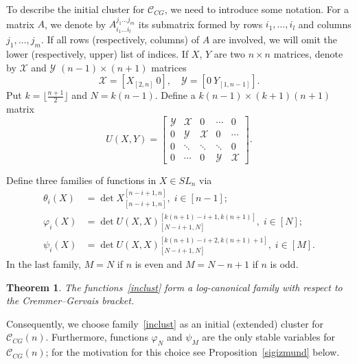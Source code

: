 \documentclass{amsart}
\newtheorem{theorem}{Theorem}
\theoremstyle{definition}
\theoremstyle{remark}
\numberwithin{equation}{section}
\numberwithin{theorem}{section}
\begin{document}
To describe the initial cluster for  ${{\mathcal C}}_{CG}$, we need to introduce some notation.
For a matrix $A$, we denote by $A_{i_1\ldots i_l}^{j_1\ldots j_m}$ its submatrix formed
by rows $i_1,\ldots, i_l$ and columns $j_1,\ldots, j_m$. If all rows (respectively, columns) of $A$ are 
involved, we will omit the lower (respectively, upper) list of indices.
If $X$, $Y$ are two $n\times n$ matrices, denote by  ${{\mathcal X}}$ and ${{\mathcal Y}}$  $(n-1)\times (n+1)$ matrices 
$$
{{\mathcal X}} = \left [ X_{[2,n]}\  0\right ], \quad {{\mathcal Y}} = \left [0\   Y_{[1,n-1]} \right ].
$$
Put $k=\lfloor \frac{n+1}{2}\rfloor$ and $N=k (n-1)$. Define a $k (n-1) \times (k+1) (n+1)$ matrix
\begin{equation}
U(X, Y) = \left [
\begin{array}{ccccc}
{{\mathcal Y}} & {{\mathcal X}} & 0 & \cdots & 0\\
0 & {{\mathcal Y}} & {{\mathcal X}}  & 0 & \cdots\\
0 & \ddots& \ddots &\ddots & 0\\
0 & \cdots & 0 & {{\mathcal Y}} & {{\mathcal X}}
\end{array}
\right ].
\label{uho}
\end{equation}

Define three families of functions in $X\in SL_n$ 
via
\begin{equation}\label{inclust}
 \begin{aligned}
{{\theta}}_i(X)&=\det X_{[n-i+1,n]}^{[n-i+1,n]}, \; i\in [n-1];\\
{{\varphi}}_i(X)&=\det U(X,X)_{[N-i+1, N]}^{[k (n+1) - i +1, k (n+1)]}, \; i\in [N];\\
{{\psi}}_i(X)&=\det U(X,X)_{[N-i+1, N]}^{[k (n+1) - i +2, k (n+1)+1]}, \; i\in [M].
\end{aligned}
\end{equation}
In the last family, $M=N$ if $n$ is even and $M=N-n+1$ if $n$ is odd.

\begin{theorem}
\label{logcan}
The functions~\eqref{inclust} form a log-canonical family with respect to the Cremmer--Gervais
bracket. 
\end{theorem}

Consequently, we choose family~\eqref{inclust} as an initial (extended) cluster for  ${{\mathcal C}}_{CG}(n)$. 
Furthermore, functions ${{\varphi}}_N$ and ${{\psi}}_M$ are the only stable variables for ${{\mathcal C}}_{CG}(n)$;
for the motivation for this choice see Proposition~\ref{sigizmund} below. 
\end{document}
